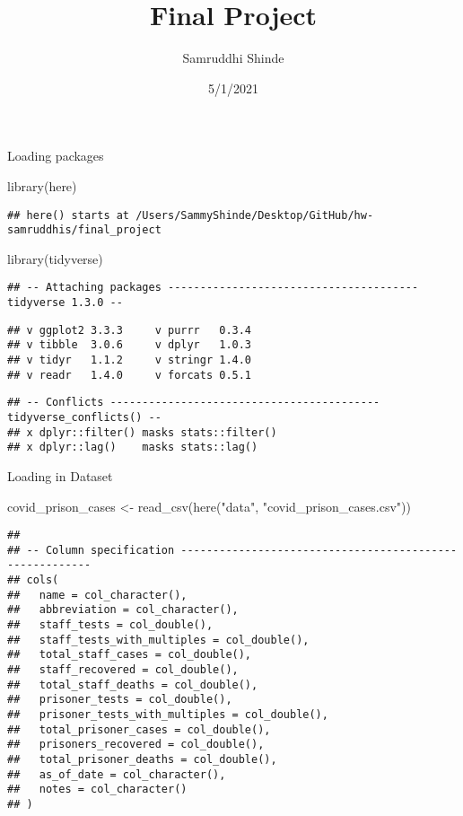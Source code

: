 \documentclass[
]{article}
\title{Final Project}
\author{Samruddhi Shinde}
\date{5/1/2021}
\newenvironment{Shaded}{\begin{snugshade}}{\end{snugshade}}
\newcommand{\FunctionTok}[1]{\textcolor[rgb]{0.00,0.00,0.00}{#1}}
\newcommand{\NormalTok}[1]{#1}
\newcommand{\OtherTok}[1]{\textcolor[rgb]{0.56,0.35,0.01}{#1}}
\newcommand{\StringTok}[1]{\textcolor[rgb]{0.31,0.60,0.02}{#1}}
\begin{document}
\maketitle

Loading packages

\begin{Shaded}
\begin{Highlighting}[]
\FunctionTok{library}\NormalTok{(here)}
\end{Highlighting}
\end{Shaded}

\begin{verbatim}
## here() starts at /Users/SammyShinde/Desktop/GitHub/hw-samruddhis/final_project
\end{verbatim}

\begin{Shaded}
\begin{Highlighting}[]
\FunctionTok{library}\NormalTok{(tidyverse)}
\end{Highlighting}
\end{Shaded}

\begin{verbatim}
## -- Attaching packages --------------------------------------- tidyverse 1.3.0 --
\end{verbatim}

\begin{verbatim}
## v ggplot2 3.3.3     v purrr   0.3.4
## v tibble  3.0.6     v dplyr   1.0.3
## v tidyr   1.1.2     v stringr 1.4.0
## v readr   1.4.0     v forcats 0.5.1
\end{verbatim}

\begin{verbatim}
## -- Conflicts ------------------------------------------ tidyverse_conflicts() --
## x dplyr::filter() masks stats::filter()
## x dplyr::lag()    masks stats::lag()
\end{verbatim}

Loading in Dataset

\begin{Shaded}
\begin{Highlighting}[]
\NormalTok{covid\_prison\_cases }\OtherTok{\textless{}{-}} \FunctionTok{read\_csv}\NormalTok{(}\FunctionTok{here}\NormalTok{(}\StringTok{"data"}\NormalTok{, }\StringTok{"covid\_prison\_cases.csv"}\NormalTok{))}
\end{Highlighting}
\end{Shaded}

\begin{verbatim}
## 
## -- Column specification --------------------------------------------------------
## cols(
##   name = col_character(),
##   abbreviation = col_character(),
##   staff_tests = col_double(),
##   staff_tests_with_multiples = col_double(),
##   total_staff_cases = col_double(),
##   staff_recovered = col_double(),
##   total_staff_deaths = col_double(),
##   prisoner_tests = col_double(),
##   prisoner_tests_with_multiples = col_double(),
##   total_prisoner_cases = col_double(),
##   prisoners_recovered = col_double(),
##   total_prisoner_deaths = col_double(),
##   as_of_date = col_character(),
##   notes = col_character()
## )
\end{verbatim}
\end{document}
